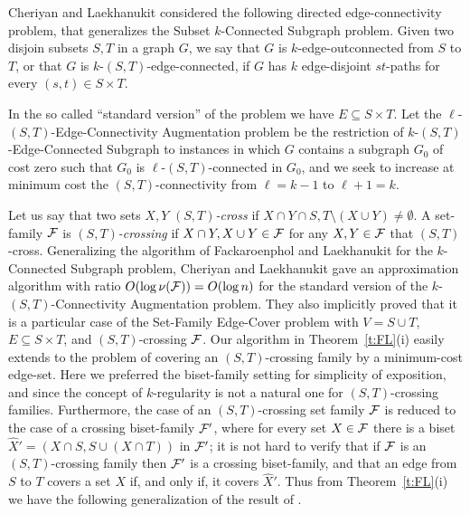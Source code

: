 Cheriyan and Laekhanukit \cite{ChL} considered the following directed edge-connectivity problem,
that gene\-ra\-lizes the {\sf Subset $k$-Connected Subgraph} problem.
Given two disjoin subsets $S,T$ in a graph $G$, we say that $G$ is $k$-edge-outconnected from $S$ to $T$,
or that $G$ is $k$-$(S,T)$-edge-connected,
if $G$ has $k$ edge-disjoint $st$-paths for every $(s,t) \in S \times T$. 

\begin{center} 
\end{center}

In the so called ``standard version'' of the problem we have $E \subseteq S \times T$.
Let the {\sf $\ell$-$(S,T)$-Edge-Connectivity Augmentation} problem be the restriction of 
{\sf $k$-$(S,T)$-Edge-Connected Subgraph} to instances in which $G$ contains a
subgraph $G_0$ of cost zero such that $G_0$ is $\ell$-$(S,T)$-connected in $G_0$,
and we seek to increase at minimum cost the $(S,T)$-connectivity from $\ell=k-1$ to $\ell+1=k$. 

Let us say that two sets $X,Y$ {\em $(S,T)$-cross} if $X \cap Y \cap S, T \setminus (X \cup Y) \neq \emptyset$.
A set-family ${\cal F}$ is {\em $(S,T)$-crossing} 
if $X \cap Y, X \cup Y \in {\cal F}$ for any $X,Y \in {\cal F}$ that $(S,T)$-cross.
Generalizing the algorithm of Fackaroenphol and Laekhanukit \cite{FL} for the 
{\sf $k$-Connected Subgraph} problem, 
Cheriyan and Laekhanukit \cite{ChL} gave an approximation
algorithm with ratio $O(\log \nu({\cal F}))=O(\log n)$ 
for the standard version of the {\sf $k$-$(S,T)$-Connectivity Augmentation} problem.
They also implicitly proved that it is a particular case of the {\sf Set-Family Edge-Cover} problem 
with $V=S \cup T$, $E \subseteq S \times T$, and $(S,T)$-crossing ${\cal F}$.
Our algorithm in Theorem~\ref{t:FL}(i) easily extends to the problem 
of covering an $(S,T)$-crossing family by a minimum-cost edge-set. 
Here we preferred the biset-family setting for simplicity of exposition, and since
the concept of $k$-regularity is not a natural one for $(S,T)$-crossing families.
Furthermore, the case of an $(S,T)$-crossing set family ${\cal F}$ 
is reduced to the case of a crossing biset-family ${\cal F}'$,
where for every set $X \in {\cal F}$ there is a biset $\hat{X}'=(X \cap S, S \cup (X \cap T))$ in ${\cal F}'$;
it is not hard to verify that if ${\cal F}$ is an $(S,T)$-crossing family then ${\cal F}'$ is 
a crossing biset-family, and that an edge from $S$ to $T$ covers a set $X$ if, and only if, it covers $\hat{X}'$. 
Thus from Theorem~\ref{t:FL}(i) we have the following generalization of the result of \cite{ChL}. 

